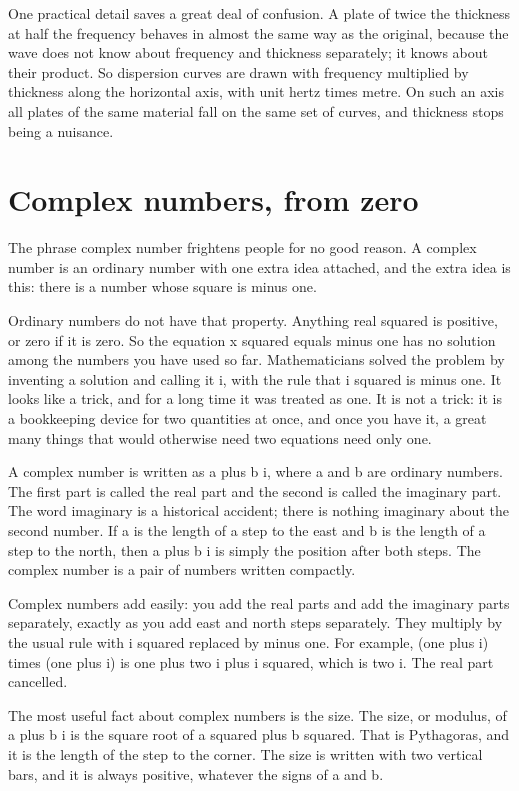 \documentclass[11pt]{article}
\begin{document}
One practical detail saves a great deal of confusion. A plate of twice the thickness at half the frequency
behaves in almost the same way as the original, because the wave does not know about frequency and thickness
separately; it knows about their product. So dispersion curves are drawn with frequency multiplied by
thickness along the horizontal axis, with unit hertz times metre. On such an axis all plates of the same
material fall on the same set of curves, and thickness stops being a nuisance.

\section{Complex numbers, from zero}

The phrase complex number frightens people for no good reason. A complex number is an ordinary number with
one extra idea attached, and the extra idea is this: there is a number whose square is minus one.

Ordinary numbers do not have that property. Anything real squared is positive, or zero if it is zero. So the
equation x squared equals minus one has no solution among the numbers you have used so far. Mathematicians
solved the problem by inventing a solution and calling it i, with the rule that i squared is minus one. It
looks like a trick, and for a long time it was treated as one. It is not a trick: it is a bookkeeping device
for two quantities at once, and once you have it, a great many things that would otherwise need two equations
need only one.

A complex number is written as a plus b i, where a and b are ordinary numbers. The first part is called the
real part and the second is called the imaginary part. The word imaginary is a historical accident; there is
nothing imaginary about the second number. If a is the length of a step to the east and b is the length of a
step to the north, then a plus b i is simply the position after both steps. The complex number is a pair of
numbers written compactly.

Complex numbers add easily: you add the real parts and add the imaginary parts separately, exactly as you add
east and north steps separately. They multiply by the usual rule with i squared replaced by minus one. For
example, (one plus i) times (one plus i) is one plus two i plus i squared, which is two i. The real part
cancelled.

The most useful fact about complex numbers is the size. The size, or modulus, of a plus b i is the square root
of a squared plus b squared. That is Pythagoras, and it is the length of the step to the corner. The size is
written with two vertical bars, and it is always positive, whatever the signs of a and b.
\end{document}
